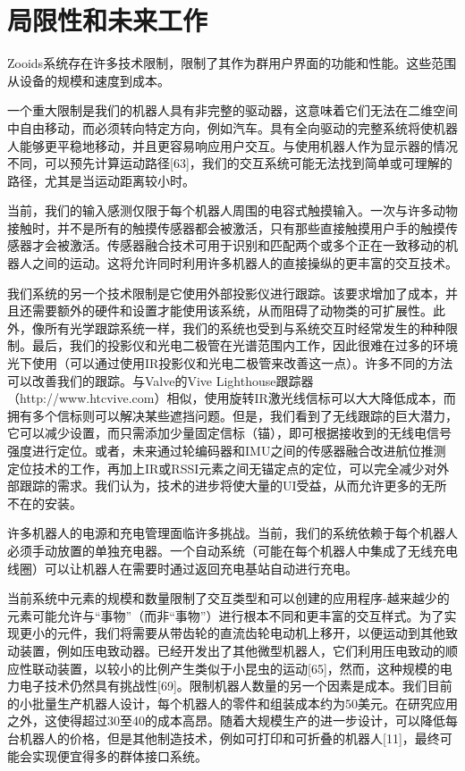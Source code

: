 \section{局限性和未来工作}

Zooids系统存在许多技术限制，限制了其作为群用户界面的功能和性能。这些范围从设备的规模和速度到成本。

一个重大限制是我们的机器人具有非完整的驱动器，这意味着它们无法在二维空间中自由移动，而必须转向特定方向，例如汽车。具有全向驱动的完整系统将使机器人能够更平稳地移动，并且更容易响应用户交互。与使用机器人作为显示器的情况不同，可以预先计算运动路径[63]，我们的交互系统可能无法找到简单或可理解的路径，尤其是当运动距离较小时。

当前，我们的输入感测仅限于每个机器人周围的电容式触摸输入。一次与许多动物接触时，并不是所有的触摸传感器都会被激活，只有那些直接触摸用户手的触摸传感器才会被激活。传感器融合技术可用于识别和匹配两个或多个正在一致移动的机器人之间的运动。这将允许同时利用许多机器人的直接操纵的更丰富的交互技术。

我们系统的另一个技术限制是它使用外部投影仪进行跟踪。该要求增加了成本，并且还需要额外的硬件和设置才能使用该系统，从而阻碍了动物类的可扩展性。此外，像所有光学跟踪系统一样，我们的系统也受到与系统交互时经常发生的种种限制。最后，我们的投影仪和光电二极管在光谱范围内工作，因此很难在过多的环境光下使用（可以通过使用IR投影仪和光电二极管来改善这一点）。许多不同的方法可以改善我们的跟踪。与Valve的Vive Lighthouse跟踪器（http://www.htcvive.com）相似，使用旋转IR激光线信标可以大大降低成本，而拥有多个信标则可以解决某些遮挡问题。但是，我们看到了无线跟踪的巨大潜力，它可以减少设置，而只需添加少量固定信标（锚），即可根据接收到的无线电信号强度进行定位。或者，未来通过轮编码器和IMU之间的传感器融合改进航位推测定位技术的工作，再加上IR或RSSI元素之间无锚定点的定位，可以完全减少对外部跟踪的需求。我们认为，技术的进步将使大量的UI受益，从而允许更多的无所不在的安装。

许多机器人的电源和充电管理面临许多挑战。当前，我们的系统依赖于每个机器人必须手动放置的单独充电器。一个自动系统（可能在每个机器人中集成了无线充电线圈）可以让机器人在需要时通过返回充电基站自动进行充电。

当前系统中元素的规模和数量限制了交互类型和可以创建的应用程序-越来越少的元素可能允许与“事物”（而非“事物”）进行根本不同和更丰富的交互样式。为了实现更小的元件，我们将需要从带齿轮的直流齿轮电动机上移开，以便运动到其他致动装置，例如压电致动器。已经开发出了其他微型机器人，它们利用压电致动的顺应性联动装置，以较小的比例产生类似于小昆虫的运动[65]，然而，这种规模的电力电子技术仍然具有挑战性[69]。限制机器人数量的另一个因素是成本。我们目前的小批量生产机器人设计，每个机器人的零件和组装成本约为50美元。在研究应用之外，这使得超过30至40的成本高昂。随着大规模生产的进一步设计，可以降低每台机器人的价格，但是其他制造技术，例如可打印和可折叠的机器人[11]，最终可能会实现便宜得多的群体接口系统。

